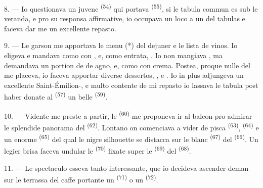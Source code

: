8. --- Io questionava un juvene  \textsuperscript{(54)} qui portava
 \textsuperscript{(55)}, si le tabula commun es sub le
veranda, e pro su responsa affirmative, io occupava un loco a un del tabulas e
faceva dar me un excellente repasto.


\VUsaut{4.0mm}
\VUsaut{3.0mm}

9. --- Le garson me apportava le menu (*) del dejuner e le lista de vinos. Io
eligeva e mandava como  con , e,
como entrata, . Io non mangiava ,
ma demandava un portion de  de agno, e, como  con crema. Postea, proque nulle del 
me placeva, io faceva apportar diverse dessertos, ,
 e . Io in plus adjungeva un excellente
Saint-Émilion-, e multo contente de mi repasto io lassava le tabula
post haber donate al  \textsuperscript{(57)} un belle
 \textsuperscript{(59)}.

10. --- Vidente me preste a partir, le  \textsuperscript{(60)} me
proponeva ir al balcon pro admirar le splendide panorama del 
\textsuperscript{(62)}. Lontano on comenciava a vider  de
pisca \textsuperscript{(63)},  \textsuperscript{(64)} e un
enorme  \textsuperscript{(65)} del qual le nigre silhouette se
distacca sur le blanc  \textsuperscript{(67)} del 
\textsuperscript{(66)}. Un legier brisa faceva undular le 
\textsuperscript{(70)} fixate super le  \textsuperscript{(69)}
del  \textsuperscript{(68)}.

\VUsaut{3.0mm}
\VUsaut{3.0mm}

11. --- Le spectaculo esseva tanto interessante, que io decideva ascender deman
sur le terrassa del caffe portante un  \textsuperscript{(71)} o
un  \textsuperscript{(72)}.

